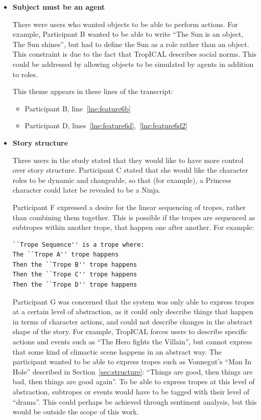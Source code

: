 \documentclass[11pt]{report}
\newcommand{\lref}[1]{\hyperlink{llineno:#1}{\ref*{#1}}}
\begin{document}
\begin{itemize}
\item \textbf{Subject must be an agent}

  There were users who wanted objects to be able to perform actions. For
  example, Participant B wanted to be able to write ``The Sun is an object, The
  Sun shines'', but had to define the Sun as a role rather than an object. This
  constraint is due to the fact that TropICAL describes social
  norms. This could be addressed by allowing objects to be simulated by agents in addition to roles.
  
This theme appears in these lines of the transcript:

\begin{itemize}
\item Participant B, line~\lref{lne:feature6b}
\item Participant D, lines~\lref{lne:feature6d},~\lref{lne:feature6d2}
\end{itemize}


\item \textbf{Story structure}

Three users in the study stated that they would like to have more control over
story structure. Participant C stated that she would like the character roles to
be dynamic and changeable, so that (for example), a Princess character could
later be revealed to be a Ninja.

Participant F expressed a desire for the linear sequencing of tropes, rather
than combining them together. This is possible if the tropes are sequenced as
subtropes within another trope, that happen one after another. For example:

\begin{verbatim}
``Trope Sequence'' is a trope where:
The ``Trope A'' trope happens
Then the ``Trope B'' trope happens
Then the ``Trope C'' trope happens
Then the ``Trope D'' trope happens
\end{verbatim}

Participant G was concerned that the system was only able to express tropes at a
certain level of abstraction, as it could only describe things that happen in
terms of character actions, and could not describe changes in the abstract shape of the
story. For example, TropICAL forces users to describe specific actions and
events such as ``The Hero fights the Villain'', but cannot express that some
kind of climactic scene happens in an abstract way. The participant wanted to be
able to express tropes such as Vonnegut's ``Man In Hole'' described in
Section~\ref{sec:structure}: ``Things are good, then things are bad, then things
are good again''. To be able to express tropes at this level of abstraction,
subtropes or events would have to be tagged with their level of ``drama''. This
could perhaps be achieved through sentiment analysis, but this would be outside
the scope of this work.


\end{itemize}
\end{document}
